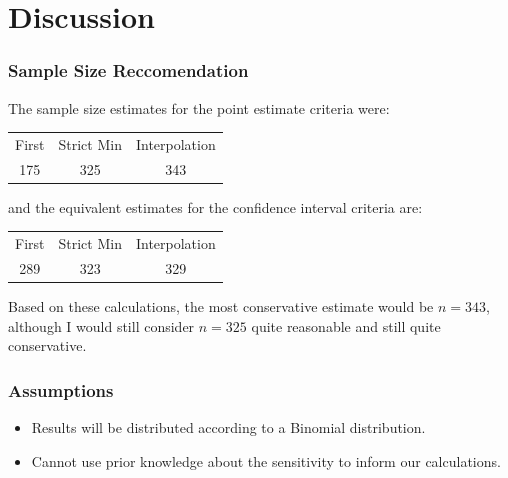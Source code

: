\documentclass{beamer}\usepackage{knitr}
\begin{document}
\section{Discussion}


\begin{frame}[fragile]
\frametitle{Sample Size Reccomendation}

The sample size estimates for the point estimate criteria were:

\begin{center}
  \begin{tabular}{ccc}
    First & Strict Min & Interpolation \\
    175 & 325 & 343 \\
  \end{tabular}
\end{center}

and the equivalent estimates for the confidence interval criteria are:

\begin{center}
  \begin{tabular}{ccc}
    First & Strict Min & Interpolation \\
    289 & 323 & 329 \\
  \end{tabular}
\end{center}

Based on these calculations, the most conservative estimate would be $n = 343$, although I would still consider $n = 325$ quite reasonable and still quite conservative.

\end{frame}


\begin{frame}
  \frametitle{Assumptions}
  
  \begin{itemize}
    \item Results will be distributed according to a Binomial distribution.
    \item Cannot use prior knowledge about the sensitivity to inform our calculations.
  \end{itemize}
  
\end{frame}
\end{document}
